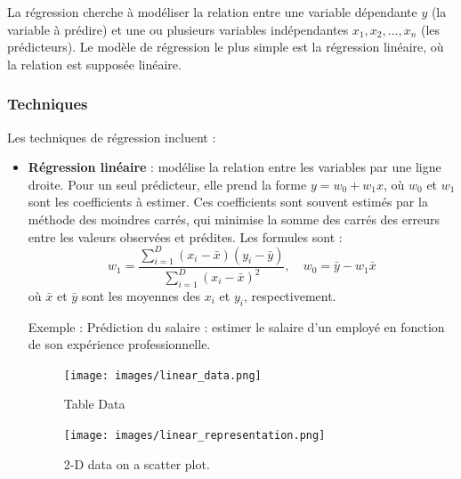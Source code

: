 \documentclass[a4paper,12pt]{report}
\begin{document}
La régression cherche à modéliser la relation entre une variable dépendante \( y \) (la variable à prédire) et une ou plusieurs variables indépendantes \( x_1, x_2, \dots, x_n \) (les prédicteurs). Le modèle de régression le plus simple est la régression linéaire, où la relation est supposée linéaire.

\subsubsection*{Techniques}

Les techniques de régression incluent :

\begin{itemize}
    \item \textbf{Régression linéaire} : modélise la relation entre les variables par une ligne droite. Pour un seul prédicteur, elle prend la forme \( y = w_0 + w_1 x \), où \( w_0 \) et \( w_1 \) sont les coefficients à estimer. Ces coefficients sont souvent estimés par la méthode des moindres carrés, qui minimise la somme des carrés des erreurs entre les valeurs observées et prédites. Les formules sont :
    \[
    w_1 = \frac{\sum_{i=1}^D (x_i - \bar{x})(y_i - \bar{y})}{\sum_{i=1}^D (x_i - \bar{x})^2}, \quad w_0 = \bar{y} - w_1 \bar{x}
    \]
    où \( \bar{x} \) et \( \bar{y} \) sont les moyennes des \( x_i \) et \( y_i \), respectivement.


    Exemple : Prédiction du salaire : estimer le salaire d’un employé en fonction de son expérience professionnelle.

    \begin{figure}[h!]
        \begin{minipage}[b]{0.5\textwidth}
            \centering
            \texttt{[image: images/linear\_data.png]} 
            \caption{Table Data}
        \end{minipage}%
        \begin{minipage}[b]{0.5\textwidth}
            \centering
            \texttt{[image: images/linear\_representation.png]} 
            \caption{2-D data on a scatter plot.}
        \end{minipage}
    \end{figure}

        \begin{minipage}[t]{0.48\textwidth} %
        \vspace{0pt} %
        

\end{minipage}
\end{itemize}
\end{document}
